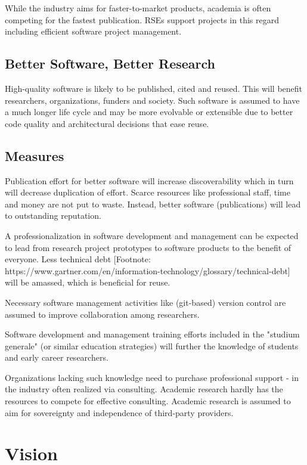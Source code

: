 \documentclass{article}
\begin{document}
While the industry aims for faster-to-market products, academia is often competing for the fastest publication.
RSEs support projects in this regard including efficient software project management.

\subsection{Better Software, Better Research}

High-quality software is likely to be published, cited and reused.
This will benefit researchers, organizations, funders and society.
Such software is assumed to have a much longer life cycle and may be more evolvable or extensible due to better code quality and architectural decisions that ease reuse.

\subsection{Measures}

Publication effort for better software will increase discoverability which in turn will decrease duplication of effort.
Scarce resources like professional staff, time and money are not put to waste. Instead, better software (publications) will lead to outstanding reputation.

A professionalization in software development and management can be expected to lead from research project prototypes to software products to the benefit of everyone.
Less technical debt [Footnote: https://www.gartner.com/en/information-technology/glossary/technical-debt] will be amassed, which is beneficial for reuse.

Necessary software management activities like (git-based) version control are assumed to improve collaboration among researchers.

Software development and management training efforts included in the "studium generale" (or similar education strategies) will further the knowledge of students and early career researchers.

Organizations lacking such knowledge need to purchase professional support - in the industry often realized via consulting.
Academic research hardly has the resources to compete for effective consulting.
Academic research is assumed to aim for sovereignty and independence of third-party providers.

\section{Vision}
\end{document}
